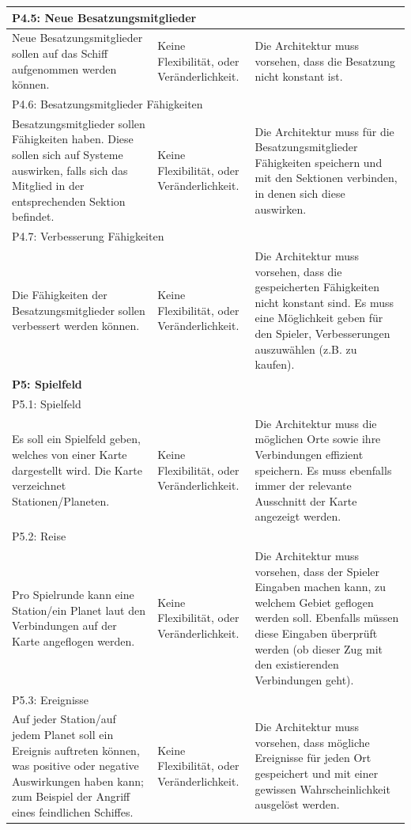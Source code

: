 \documentclass[fontsize=12pt,paper=a4,twoside]{scrartcl}
\begin{document}
\begin{longtable}[c]{|p{5cm}|p{5cm}|p{5cm}|}
\\ \hline
\multicolumn{3}{|l|}{{P4.5: Neue Besatzungsmitglieder}} 
\\ \hline
Neue Besatzungsmitglieder sollen auf das Schiff aufgenommen werden können. & Keine Flexibilität, oder Veränderlichkeit.    &  Die Architektur muss vorsehen, dass die Besatzung nicht konstant ist. 
\\ \hline
\multicolumn{3}{|l|}{{P4.6: Besatzungsmitglieder Fähigkeiten}} 
\\ \hline
Besatzungsmitglieder sollen Fähigkeiten haben. Diese sollen sich auf Systeme auswirken, falls sich das Mitglied in der entsprechenden Sektion befindet. & Keine Flexibilität, oder Veränderlichkeit.    &  Die Architektur muss für die Besatzungsmitglieder Fähigkeiten speichern und mit den Sektionen verbinden, in denen sich diese auswirken.
\\ \hline
\multicolumn{3}{|l|}{{P4.7: Verbesserung Fähigkeiten}} 
\\ \hline
Die Fähigkeiten der Besatzungsmitglieder sollen verbessert werden können. & Keine Flexibilität, oder Veränderlichkeit.    & Die Architektur muss vorsehen, dass die gespeicherten Fähigkeiten nicht konstant sind. Es muss eine Möglichkeit geben für den Spieler, Verbesserungen auszuwählen (z.B. zu kaufen). 
\\ \hline
%
\multicolumn{3}{|l|}{{\textbf{P5: Spielfeld}}} 
\\ \hline         
\multicolumn{3}{|l|}{{P5.1: Spielfeld}} 
\\ \hline
Es soll ein Spielfeld geben, welches von einer Karte dargestellt wird. Die Karte verzeichnet Stationen/Planeten. & Keine Flexibilität, oder Veränderlichkeit.    & Die Architektur muss die möglichen Orte sowie ihre Verbindungen effizient speichern. Es muss ebenfalls immer der relevante Ausschnitt der Karte angezeigt werden. 
\\ \hline          
\multicolumn{3}{|l|}{{P5.2: Reise}} 
\\ \hline
Pro Spielrunde kann eine Station/ein Planet laut den Verbindungen auf der Karte angeflogen werden.  & Keine Flexibilität, oder Veränderlichkeit.    & Die Architektur muss vorsehen, dass der Spieler Eingaben machen kann, zu welchem Gebiet geflogen werden soll. Ebenfalls müssen diese Eingaben überprüft werden (ob dieser Zug mit den existierenden Verbindungen geht). 
\\ \hline
\multicolumn{3}{|l|}{{P5.3: Ereignisse}} 
\\ \hline
Auf jeder Station/auf jedem Planet soll ein Ereignis auftreten können, was positive oder negative Auswirkungen haben kann; zum Beispiel der Angriff eines feindlichen Schiffes.  & Keine Flexibilität, oder Veränderlichkeit.    &  Die Architektur muss vorsehen, dass mögliche Ereignisse für jeden Ort gespeichert und mit einer gewissen Wahrscheinlichkeit ausgelöst werden. 

\end{longtable}
\end{document}
